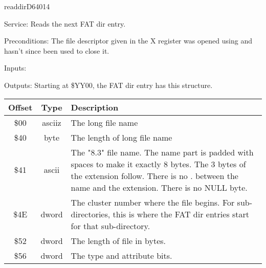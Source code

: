 \begin{hyppotrap}{readdir}{D640}{14}
\item [Service:]
  Reads the next FAT dir entry.
\item [Preconditions:]
  The file descriptor given in the X register was opened using
   and  hasn't since been used to close it.
\item [Inputs:]
\item [Outputs:]
  Starting at \$YY00, the FAT dir entry has this structure.
  {\setlength{\tabcolsep}{2mm}
  \begin{tabular}{|c|c|p{6.9cm}|}
  \hline
  \textbf{Offset} & \textbf{Type} & \textbf{Description}
  \\\hline
  \$00 & asciiz & The long file name
  \\
  \$40 & byte & The length of long file name
  \\
  \$41 & ascii & The "8.3" file name. The name part is padded with spaces to make
               it exactly 8 bytes. The 3 bytes of the extension follow. There is
               no . between the name and the extension. There is no NULL byte.
  \\
  \$4E & dword & The cluster number where the file begins. For sub-directories,
               this is where the FAT dir entries start for that sub-directory.
  \\
  \$52 & dword & The length of file in bytes.
  \\
  \$56 & dword & The type and attribute bits.
  \\\hline
  \end{tabular}
  }


\end{hyppotrap}
